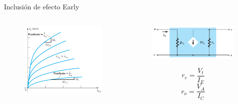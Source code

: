 \documentclass[t,aspectratio=169]{beamer}
\begin{document}
\begin{frame}{Inclusión de efecto Early}

\begin{columns}
\begin{column}{0.5\textwidth}
\begin{figure}[H]
    \centering
    \includegraphics[width=\textwidth]{figuras/modelo_re_ec_5.png}
\end{figure}
\end{column}
\begin{column}{0.5\textwidth}
\begin{figure}[H]
    \centering
    \includegraphics[width=\textwidth]{figuras/modelo_re_ec_6.png}
\end{figure}

\[ r_e = \dfrac{V_t}{I_E} \]
\[ r_o = \dfrac{V_A}{I_C} \]   

\end{column}
\end{columns}
    
\end{frame}
\end{document}
